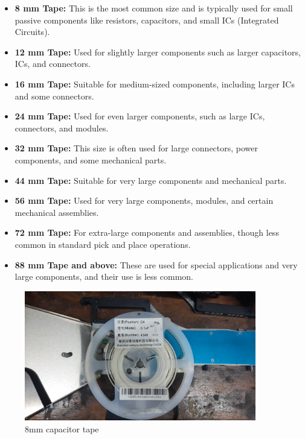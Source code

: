 \documentclass[a4paper,10pt]{report}
\begin{document}
\begin{itemize}
    \item \textbf{8 mm Tape:} This is the most common size and is typically used for small passive components like resistors, capacitors, and small ICs (Integrated Circuits).
    \item \textbf{12 mm Tape:} Used for slightly larger components such as larger capacitors, ICs, and connectors.
    \item \textbf{16 mm Tape:} Suitable for medium-sized components, including larger ICs and some connectors.
    \item \textbf{24 mm Tape:} Used for even larger components, such as large ICs, connectors, and modules.
    \item \textbf{32 mm Tape:} This size is often used for large connectors, power components, and some mechanical parts.
    \item \textbf{44 mm Tape:} Suitable for very large components and mechanical parts.
    \item \textbf{56 mm Tape:} Used for very large components, modules, and certain mechanical assemblies.
    \item \textbf{72 mm Tape:} For extra-large components and assemblies, though less common in standard pick and place operations.
    \item \textbf{88 mm Tape and above:} These are used for special applications and very large components, and their use is less common.
\end{itemize}
\begin{figure}[!htb]
 \centering
 \includegraphics[width=0.9\textwidth]{images/step1.jpg}
 \caption{8mm capacitor tape}
\end{figure}
\newpage
\end{document}
